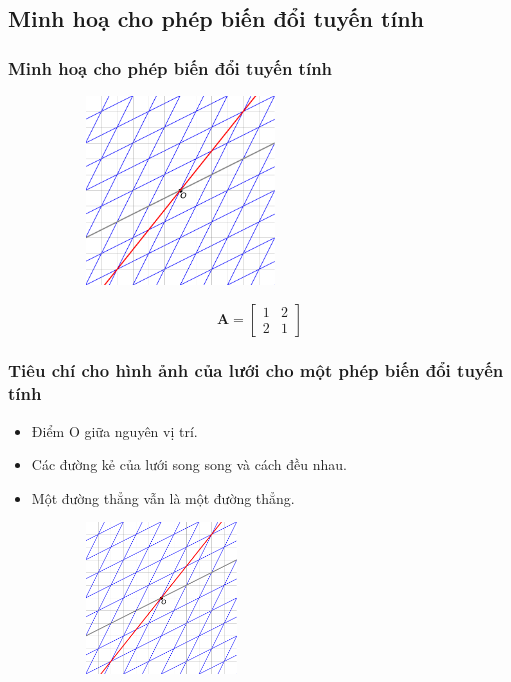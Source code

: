 \subsection{Minh hoạ cho phép biến đổi tuyến tính}
\begin{frame}
    \frametitle{Minh hoạ cho phép biến đổi tuyến tính}
    
    \begin{figure}[H]
        \centering
        \includegraphics[width=7cm, height=5cm]{Slides/Figure/LT1.png}
    \end{figure}
 \[\mathbf{A}=\begin{bmatrix}
        1&2\\2&1
    \end{bmatrix}\]
\end{frame}
\begin{frame}
    \frametitle{Tiêu chí cho hình ảnh của lưới cho một phép biến đổi tuyến tính}
    \begin{itemize}
    \item Điểm O giữa nguyên vị trí.
    \item Các đường kẻ của lưới song song và cách đều nhau.
    \item Một đường thẳng vẫn là một đường thẳng.
\end{itemize}
\begin{figure}[H]
        \centering
        \includegraphics[width=6cm, height=4cm]{Slides/Figure/LT1.png}
    \end{figure}
\end{frame}
